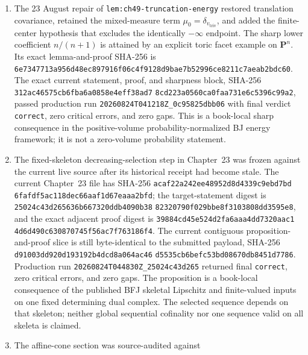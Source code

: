 \begin{enumerate}
  omitting a summand.  The exact repaired theorem-and-proof block has SHA-256
  \texttt{38bd7071c4722348dc8a29f7f890714e8e96e466fc09a814a63fbe93a95a5973}.
  A production Rethlas launch was unavailable on 22 August because of the
  account cap; no receipt exists, so this integration remains an explicit
  Rethlas gate rather than a verified new result.
\item The 23 August repair of \texttt{lem:ch49-truncation-energy} restored
  translation covariance, retained the mixed-measure term
  \(\mu_0=\delta_{v_{\mathrm{triv}}}\), and added the finite-center
  hypothesis that excludes the identically \(-\infty\) endpoint.  The
  sharp lower coefficient \(n/(n+1)\) is attained by an explicit toric
  facet example on \(\mathbf P^n\).  Its exact lemma-and-proof SHA-256 is
  \texttt{6e7347713a956d48ec897916f06c4f9128d9bae7b52996ce8211c7aeab2bdc60}.
  The exact current statement, proof, and sharpness block, SHA-256
  \texttt{312ac46575cb6fba6a0858e4eff38ad7}\allowbreak
  \texttt{8cd223a0560ca0faa731e6c5396c99a2}, passed production run
  \texttt{20260824T041218Z\_0c95825dbb06} with final verdict
  \texttt{correct}, zero critical errors, and zero gaps.  This is a book-local
  sharp consequence in the positive-volume probability-normalized BJ energy
  framework; it is not a zero-volume probability statement.
\item The fixed-skeleton decreasing-selection step in Chapter~23 was frozen
  against the current live source after its historical receipt had become
  stale.  The current Chapter~23 file has SHA-256
  \texttt{acaf22a242ee48952d8d4339c9ebd7bd}\allowbreak
  \texttt{6fafdf5ac118dec66aaf1d67eaaa2bfd}; the target-statement digest is
  \texttt{25024c43d265636b667320ddb4090b38}\allowbreak
  \texttt{82320790f029bbe8f3103808dd3595e8}, and the exact adjacent proof digest is
  \texttt{39884cd45e524d2fa6aaa4dd7320aac1}\allowbreak
  \texttt{4d6d490c630870745f56ac7f763186f4}.  The current contiguous
  proposition-and-proof slice is still byte-identical to the submitted
  payload, SHA-256
  \texttt{d91003dd920d193192b4dcd8a064ac46}\allowbreak
  \texttt{d5535cb6befc53bd08670db8451d7786}.  Production run
  \texttt{20260824T044830Z\_25024c43d265} returned final
  \texttt{correct}, zero critical errors, and zero gaps.  The proposition is
  a book-local consequence of the published BFJ skeletal Lipschitz and
  finite-valued inputs on one fixed determining dual complex.  The selected
  sequence depends on that skeleton; neither global sequential cofinality nor
  one sequence valid on all skeleta is claimed.
\item The affine-cone section was source-audited against

\end{enumerate}
